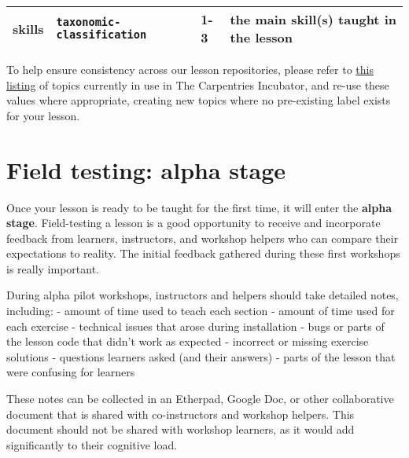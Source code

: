 \documentclass[
]{book}
\begin{document}
\begin{longtable}[]{@{}llll@{}}
\begin{minipage}[t]{0.26\columnwidth}
skills\strut
\end{minipage} & \begin{minipage}[t]{0.26\columnwidth}\raggedright
\texttt{taxonomic-classification}\strut
\end{minipage} & \begin{minipage}[t]{0.21\columnwidth}\raggedright
1-3\strut
\end{minipage} & \begin{minipage}[t]{0.16\columnwidth}\raggedright
the main skill(s) taught in the lesson\strut
\end{minipage}\tabularnewline
\bottomrule
\end{longtable}

To help ensure consistency across our lesson repositories,
please refer to \href{https://docs.google.com/spreadsheets/d/1KkmBtCu4PaNb5nzJAD82UHcfHQlaPY84qPVxw8WO8es/edit?usp=sharing}{this listing} of topics currently
in use in The Carpentries Incubator,
and re-use these values where appropriate,
creating new topics where no pre-existing label exists for your lesson.

\hypertarget{field-testing-alpha-stage}{%
\section{Field testing: alpha stage}\label{field-testing-alpha-stage}}

Once your lesson is ready to be taught for the first
time, it will enter the \textbf{alpha stage}. Field-testing a
lesson is a good opportunity to receive and incorporate
feedback from learners, instructors, and workshop
helpers who can compare their expectations to
reality. The initial feedback gathered during these first
workshops is really important.

During alpha pilot workshops, instructors and helpers should take detailed notes, including:
- amount of time used to teach each section
- amount of time used for each exercise
- technical issues that arose during installation
- bugs or parts of the lesson code that didn't work as expected
- incorrect or missing exercise solutions
- questions learners asked (and their answers)
- parts of the lesson that were confusing for learners

These notes can be collected in an Etherpad, Google Doc, or other collaborative document that is shared
with co-instructors and workshop helpers. This document should not be shared with workshop learners,
as it would add significantly to their cognitive load.
\end{document}
